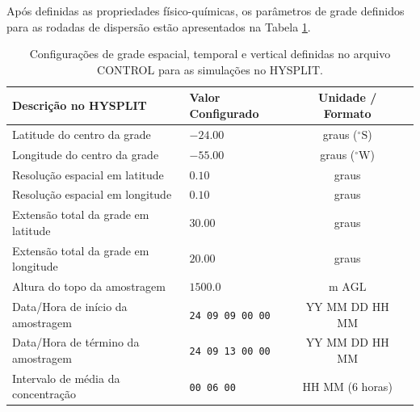 	Após definidas as propriedades físico-químicas, os parâmetros de grade definidos para as rodadas de dispersão estão apresentados na Tabela \ref{table:grid_hysplit}.
	
	\begin{table}[htbp]
		\centering

		\begin{tabular}{llcc}
			\toprule \textbf{Descrição no HYSPLIT} & \textbf{Valor Configurado} & \textbf{Unidade / Formato} \\
			\midrule
			Latitude do centro da grade & $-24.00$ & graus ($^\circ\text{S}$) \\
			Longitude do centro da grade & $-55.00$ & graus ($^\circ\text{W}$) \\
			Resolução espacial em latitude & $0.10$ & graus \\
			Resolução espacial em longitude & $0.10$ & graus \\
			Extensão total da grade em latitude & $30.00$ & graus \\
			Extensão total da grade em longitude & $20.00$ & graus \\
			Altura do topo da amostragem & $1500.0$ & $\text{m AGL}$ \\
			Data/Hora de início da amostragem & \texttt{24 09 09 00 00} & YY MM DD HH MM \\
			Data/Hora de término da amostragem & \texttt{24 09 13 00 00} & YY MM DD HH MM \\
			Intervalo de média da concentração & \texttt{00 06 00} & HH MM (6 horas) \\
			\bottomrule
		\end{tabular}
		\caption{Configurações de grade espacial, temporal e vertical definidas no arquivo CONTROL para as simulações no HYSPLIT.}
		\label{table:grid_hysplit}
	\end{table}	
	
 
	